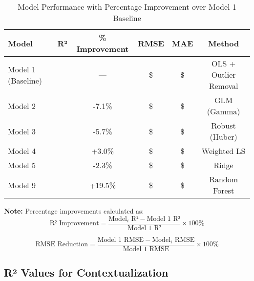 \begin{table}[h!]
\centering
\caption{Model Performance with Percentage Improvement over Model 1 Baseline}
\label{tab:comparison_with_improvements}
\begin{tabular}{lccccc}
\toprule
\textbf{Model} & \textbf{R²} & \textbf{\% Improvement} & \textbf{RMSE} & \textbf{MAE} & \textbf{Method} \\
\midrule
Model 1 (Baseline) & \ModelOneRSquaredTest{} & --- & \$\ModelOneRMSETest{} & \$\ModelOneMAETest{} & OLS + Outlier Removal \\
\midrule
Model 2 & \ModelTwoRSquaredTest{} & -7.1\% & \$\ModelTwoRMSETest{} & \$\ModelTwoMAETest{} & GLM (Gamma) \\
Model 3 & \ModelThreeRSquaredTest{} & -5.7\% & \$\ModelThreeRMSETest{} & \$\ModelThreeMAETest{} & Robust (Huber) \\
Model 4 & \ModelFourRSquaredTest{} & +3.0\% & \$\ModelFourRMSETest{} & \$\ModelFourMAETest{} & Weighted LS \\
Model 5 & \ModelFiveRSquaredTest{} & -2.3\% & \$\ModelFiveRMSETest{} & \$\ModelFiveMAETest{} & Ridge \\
Model 9 & \ModelNineRSquaredTest{} & +19.5\% & \$\ModelNineRMSETest{} & \$\ModelNineMAETest{} & Random Forest \\
\bottomrule
\end{tabular}
\end{table}

\textbf{Note:} Percentage improvements calculated as:
\begin{equation}
\text{R² Improvement} = \frac{\text{Model}_i\text{ R²} - \text{Model 1 R²}}{\text{Model 1 R²}} \times 100\%
\end{equation}

\begin{equation}
\text{RMSE Reduction} = \frac{\text{Model 1 RMSE} - \text{Model}_i\text{ RMSE}}{\text{Model 1 RMSE}} \times 100\%
\end{equation}


\subsection{R² Values for Contextualization}

